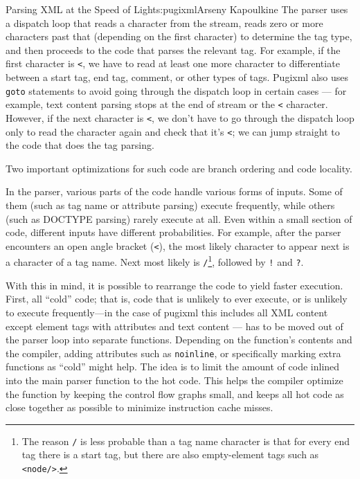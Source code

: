 \begin{aosachapter}{Parsing XML at the Speed of Light}{s:pugixml}{Arseny Kapoulkine}
The parser uses a dispatch loop that reads a character from the stream,
reads zero or more characters past that (depending on the first
character) to determine the tag type, and then proceeds to the code that
parses the relevant tag. For example, if the first character is
\texttt{\textless{}}, we have to read at least one more character to
differentiate between a start tag, end tag, comment, or other types of
tags. Pugixml also uses \texttt{goto} statements to avoid going through
the dispatch loop in certain cases --- for example, text content parsing
stops at the end of stream or the \texttt{\textless{}} character.
However, if the next character is \texttt{\textless{}}, we don't have to
go through the dispatch loop only to read the character again and check
that it's \texttt{\textless{}}; we can jump straight to the code that
does the tag parsing.

Two important optimizations for such code are branch ordering and code
locality.

In the parser, various parts of the code handle various forms of inputs.
Some of them (such as tag name or attribute parsing) execute frequently,
while others (such as DOCTYPE parsing) rarely execute at all. Even
within a small section of code, different inputs have different
probabilities. For example, after the parser encounters an open angle
bracket (\texttt{\textless{}}), the most likely character to appear next
is a character of a tag name. Next most likely is \texttt{/}\footnote{The
  reason \texttt{/} is less probable than a tag name character is that
  for every end tag there is a start tag, but there are also
  empty-element tags such as \texttt{\textless{}node/\textgreater{}}.},
followed by \texttt{!} and \texttt{?}.

With this in mind, it is possible to rearrange the code to yield faster
execution. First, all ``cold'' code; that is, code that is unlikely to
ever execute, or is unlikely to execute frequently---in the case of
pugixml this includes all XML content except element tags with
attributes and text content --- has to be moved out of the parser loop
into separate functions. Depending on the function's contents and the
compiler, adding attributes such as \texttt{noinline}, or specifically
marking extra functions as ``cold'' might help. The idea is to limit the
amount of code inlined into the main parser function to the hot code.
This helps the compiler optimize the function by keeping the control
flow graphs small, and keeps all hot code as close together as possible
to minimize instruction cache misses.


\end{aosachapter}
